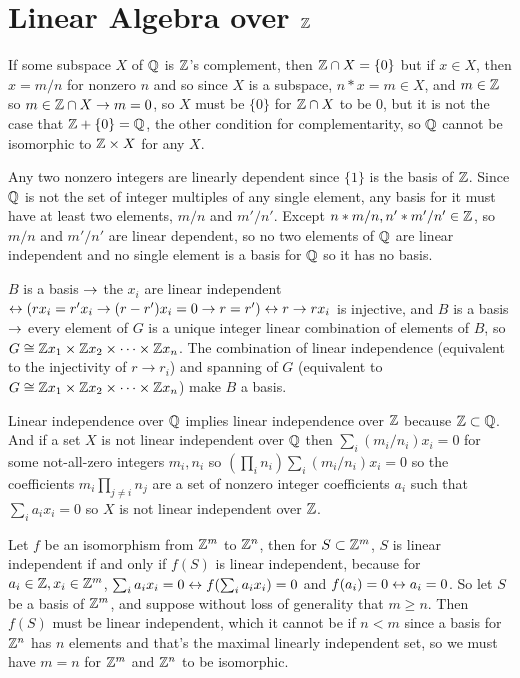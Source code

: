 \documentclass[11pt, oneside]{article}   	%
\begin{document}
\section{Linear Algebra over $\mathbb{Z}$}
\be
\item If some subspace $X$ of $\mathbb{Q}$ is $\mathbb{Z}$'s complement, then $\mathbb{Z} \cap X = \{0\}$ but if $x \in X$, then $x = m/n$ for nonzero $n$ and so since $X$ is a subspace, $n * x = m \in X$, and $m \in \mathbb{Z}$ so $m \in \mathbb{Z} \cap X\rightarrow m = 0$, so $X$ must be $\{0\}$ for $\mathbb{Z} \cap X$ to be 0, but it is not the case that $\mathbb{Z} + \{0\} = \mathbb{Q}$, the other condition for complementarity, so $\mathbb{Q}$ cannot be isomorphic to $\mathbb{Z} \times X$ for any $X$.
\item Any two nonzero integers are linearly dependent since $\{1\}$ is the basis of $\mathbb{Z}$. Since $\mathbb{Q}$ is not the set of integer multiples of any single element, any basis for it must have at least two elements, $m/n$ and $m'/n'$. Except $n * m/n, n' * m'/n' \in \mathbb{Z}$, so $m/n$ and $m'/n'$ are linear dependent, so no two elements of $\mathbb{Q}$ are linear independent and no single element is a basis for $\mathbb{Q}$ so it has no basis.
\item $B$ is a basis $\rightarrow$ the $x_i$ are linear independent $\leftrightarrow (rx_i = r'x_i \rightarrow (r - r')x_i = 0 \rightarrow r = r') \leftrightarrow r \to rx_i$ is injective, and $B$ is a basis $\rightarrow$ every element of $G$ is a unique integer linear combination of elements of $B$, so $G \cong \mathbb{Z} x_1 \times \mathbb{Z} x_2 \times \cdots\times \mathbb{Z} x_n$. The combination of linear independence (equivalent to the injectivity of $r \to r_i$) and spanning of $G$ (equivalent to $G \cong \mathbb{Z} x_1 \times \mathbb{Z} x_2 \times \cdots\times \mathbb{Z} x_n$) make $B$ a basis.
\item Linear independence over $\mathbb{Q}$ implies linear independence over $\mathbb{Z}$ because $\mathbb{Z} \subset \mathbb{Q}$. And if a set $X$ is not linear independent over $\mathbb{Q}$ then $\sum_i (m_i/n_i)x_i = 0$ for some not-all-zero integers $m_i, n_i$ so $(\prod_in_i)\sum_i(m_i/n_i)x_i = 0$ so the coefficients $m_i\prod_{j\not=i}n_j$ are a set of nonzero integer coefficients $a_i$ such that $\sum_i a_ix_i = 0$ so $X$ is not linear independent over $\mathbb{Z}$.
\item Let $f$ be an isomorphism from $\mathbb{Z}^m$ to $\mathbb{Z}^n$, then for $S\subset \mathbb{Z}^m$, $S$ is linear independent if and only if $f(S)$ is linear independent, because for $a_i \in \mathbb{Z}, x_i \in \mathbb{Z}^m$, $\sum_ia_ix_i = 0 \leftrightarrow f(\sum_ia_ix_i) = 0$ and $f(a_i) = 0 \leftrightarrow a_i = 0$. So let $S$ be a basis of $\mathbb{Z}^m$, and suppose without loss of generality that $m \ge n$. Then $f(S)$ must be linear independent, which it cannot be if $n < m$ since a basis for $\mathbb{Z}^n$ has $n$ elements and that's the maximal linearly independent set, so we must have $m = n$ for $\mathbb{Z}^m$ and $\mathbb{Z}^n$ to be isomorphic.
\end{document}
